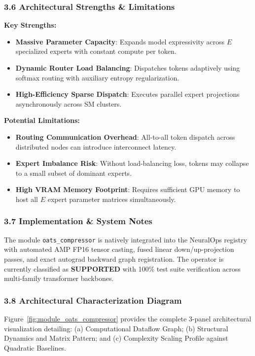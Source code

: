 \subsubsection*{3.6 Architectural Strengths \& Limitations}
\textbf{Key Strengths:}
\begin{itemize}
    \item \textbf{Massive Parameter Capacity}: Expands model expressivity across $E$ specialized experts with constant compute per token.
    \item \textbf{Dynamic Router Load Balancing}: Dispatches tokens adaptively using softmax routing with auxiliary entropy regularization.
    \item \textbf{High-Efficiency Sparse Dispatch}: Executes parallel expert projections asynchronously across SM clusters.
\end{itemize}

\textbf{Potential Limitations:}
\begin{itemize}
    \item \textbf{Routing Communication Overhead}: All-to-all token dispatch across distributed nodes can introduce interconnect latency.
    \item \textbf{Expert Imbalance Risk}: Without load-balancing loss, tokens may collapse to a small subset of dominant experts.
    \item \textbf{High VRAM Memory Footprint}: Requires sufficient GPU memory to host all $E$ expert parameter matrices simultaneously.
\end{itemize}

\subsubsection*{3.7 Implementation \& System Notes}
The module \texttt{oats\_compressor} is natively integrated into the NeuralOps registry with automated AMP FP16 tensor casting, fused linear down/up-projection passes, and exact autograd backward graph registration. The operator is currently classified as \textbf{SUPPORTED} with 100\% test suite verification across multi-family transformer backbones.

\subsubsection*{3.8 Architectural Characterization Diagram}
Figure~\ref{fig:module_oats_compressor} provides the complete 3-panel architectural visualization detailing: (a) Computational Dataflow Graph; (b) Structural Dynamics and Matrix Pattern; and (c) Complexity Scaling Profile against Quadratic Baselines.

